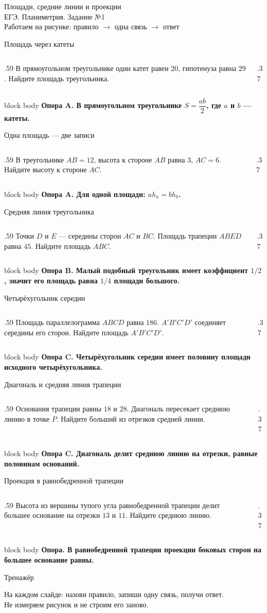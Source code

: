 \documentclass[aspectratio=169,12pt]{beamer}
\newcommand{\support}[2]{%
\vfill
\begin{beamercolorbox}[wd=\linewidth,sep=1.1ex,rounded=true,shadow=false]{block body}
\textbf{#1}\quad #2
\end{beamercolorbox}}
\newcommand{\taskframe}[4]{%
\begin{frame}{#1}
\begin{columns}[T,onlytextwidth]
\begin{column}{.59\textwidth}
\vspace{3mm}\Large #2
\end{column}
\begin{column}{.37\textwidth}
\centering\resizebox{\linewidth}{!}{#3}
\end{column}
\end{columns}
\support{#4}{}
\end{frame}}
\begin{document}
\begin{frame}
\vfill
\begin{center}
{\color{lessonblue} Площади, средние линии и проекции}\\[8mm]
{\Large ЕГЭ. Планиметрия. Задание №1}\\[15mm]
{\large Работаем на рисунке: правило \(\rightarrow\) одна связь \(\rightarrow\) ответ}
\end{center}
\vfill
\end{frame}

\taskframe{Площадь через катеты}{
В прямоугольном треугольнике один катет равен \(20\), гипотенуза равна \(29\).
Найдите площадь треугольника.
}{\figRightTriangle}{Опора A. В прямоугольном треугольнике \(S=\dfrac{ab}{2}\), где \(a\) и \(b\) --- катеты.}

\taskframe{Одна площадь --- две записи}{
В треугольнике \(AB=12\), высота к стороне \(AB\) равна \(3\), \(AC=6\).
Найдите высоту к стороне \(AC\).
}{\figTriangleAltitudes}{Опора A. Для одной площади: \(a h_a=b h_b\).}

\taskframe{Средняя линия треугольника}{
Точки \(D\) и \(E\) --- середины сторон \(AC\) и \(BC\). Площадь трапеции \(ABED\)
равна \(45\). Найдите площадь \(ABC\).
}{\figMidlineTriangle}{Опора B. Малый подобный треугольник имеет коэффициент \(1/2\), значит его площадь равна \(1/4\) площади большого.}

\taskframe{Четырёхугольник середин}{
Площадь параллелограмма \(ABCD\) равна \(186\). \(A'B'C'D'\) соединяет середины его сторон.
Найдите площадь \(A'B'C'D'\).
}{\figParallelogramMidpoints}{Опора C. Четырёхугольник середин имеет половину площади исходного четырёхугольника.}

\taskframe{Диагональ и средняя линия трапеции}{
Основания трапеции равны \(18\) и \(28\). Диагональ пересекает среднюю линию в точке \(P\).
Найдите больший из отрезков средней линии.
}{\figTrapezoidDiagonal}{Опора C. Диагональ делит среднюю линию на отрезки, равные половинам оснований.}

\taskframe{Проекция в равнобедренной трапеции}{
Высота из вершины тупого угла равнобедренной трапеции делит большее основание
на отрезки \(13\) и \(11\). Найдите среднюю линию.
}{\figIsoscelesTrapezoid}{Опора. В равнобедренной трапеции проекции боковых сторон на большее основание равны.}

\begin{frame}{Тренажёр}
\begin{center}
\Large На каждом слайде: назови правило, запиши одну связь, получи ответ.\\[8mm]
\large Не измеряем рисунок и не строим его заново.
\end{center}
\end{frame}
\end{document}
